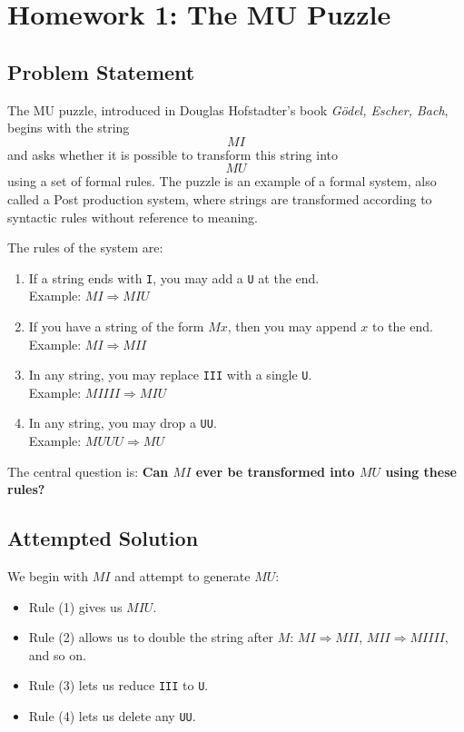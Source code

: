 \documentclass[12pt]{article}
\begin{document}
\section{Homework 1: The MU Puzzle}

\subsection{Problem Statement}
The MU puzzle, introduced in Douglas Hofstadter's book \textit{Gödel, Escher, Bach}, begins with the string
\[
MI
\]
and asks whether it is possible to transform this string into
\[
MU
\]
using a set of formal rules. The puzzle is an example of a formal system, also called a Post production system, where strings are transformed according to syntactic rules without reference to meaning.

The rules of the system are:

\begin{enumerate}
    \item If a string ends with \texttt{I}, you may add a \texttt{U} at the end. \\
          Example: $MI \Rightarrow MIU$
    \item If you have a string of the form $M x$, then you may append $x$ to the end. \\
          Example: $MI \Rightarrow MII$
    \item In any string, you may replace \texttt{III} with a single \texttt{U}. \\
          Example: $MIIII \Rightarrow MIU$
    \item In any string, you may drop a \texttt{UU}. \\
          Example: $MUUU \Rightarrow MU$
\end{enumerate}

The central question is: \textbf{Can $MI$ ever be transformed into $MU$ using these rules?}

\subsection{Attempted Solution}
We begin with $MI$ and attempt to generate $MU$:

\begin{itemize}
    \item Rule (1) gives us $MIU$.
    \item Rule (2) allows us to double the string after $M$: $MI \Rightarrow MII$, $MII \Rightarrow MIIII$, and so on.
    \item Rule (3) lets us reduce \texttt{III} to \texttt{U}.
    \item Rule (4) lets us delete any \texttt{UU}.
\end{itemize}
\end{document}
